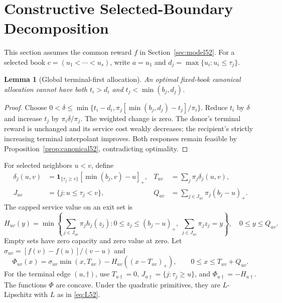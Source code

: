 \documentclass[11pt,letterpaper]{article}
\newtheorem{lemma}[theorem]{Lemma}
\theoremstyle{definition}\newtheorem{remark}[theorem]{Remark}
\begin{document}
\section{Constructive Selected-Boundary Decomposition}\label{sec:boundaries52}
This section assumes the common reward $f$ in Section~\ref{sec:model52}. For a selected book $c=(u_1<\cdots<u_s)$, write $a=u_1$ and $d_j=\max\{u_i:u_i\leq\tau_j\}$.
\begin{lemma}[Global terminal-first allocation]\label{lem:terminal52}
An optimal fixed-book canonical allocation cannot have both $t_i>d_i$ and $t_j<\min(b_j,d_j)$.
\end{lemma}
\begin{proof}
Choose $0<\delta\leq\min\{t_i-d_i,\pi_j[\min(b_j,d_j)-t_j]/\pi_i\}$. Reduce $t_i$ by $\delta$ and increase $t_j$ by $\pi_i\delta/\pi_j$. The weighted change is zero. The donor's terminal reward is unchanged and its service cost weakly decreases; the recipient's strictly increasing terminal interpolant improves. Both responses remain feasible by Proposition~\ref{prop:canonical52}, contradicting optimality.
\end{proof}
For selected neighbors $u<v$, define
\begin{align}
 \delta_j(u,v)&=\mathbf1_{\{\tau_j\geq v\}}[\min(b_j,v)-u]_+,
 &T_{uv}&=\sum_j\pi_j\delta_j(u,v),\label{eq:terminalarc52}\\
 J_{uv}&=\{j:u\leq\tau_j<v\},
 &Q_{uv}&=\sum_{j\in J_{uv}}\pi_j(b_j-u)_+.\label{eq:exit52}
\end{align}
The capped service value on an exit set is
\begin{equation}\label{eq:servicearc52}
 H_{uv}(y)=\min\left\{\sum_{j\in J_{uv}}\pi_jh_j(z_j):
 0\leq z_j\leq(b_j-u)_+,\ \sum_{j\in J_{uv}}\pi_jz_j=y\right\},\quad 0\leq y\leq Q_{uv}.
\end{equation}
Empty sets have zero capacity and zero value at zero. Let $\sigma_{uv}=[f(v)-f(u)]/(v-u)$ and
\begin{equation}\label{eq:arc52}
 \Phi_{uv}(x)=\sigma_{uv}\min(x,T_{uv})-H_{uv}((x-T_{uv})_+),
 \qquad 0\leq x\leq T_{uv}+Q_{uv}.
\end{equation}
For the terminal edge $(u,\dagger)$, use $T_{u\dagger}=0$, $J_{u\dagger}=\{j:\tau_j\geq u\}$, and $\Phi_{u\dagger}=-H_{u\dagger}$. The functions $\Phi$ are concave. Under the quadratic primitives, they are $L$-Lipschitz with $L$ as in \eqref{eq:L52}.
\end{document}
